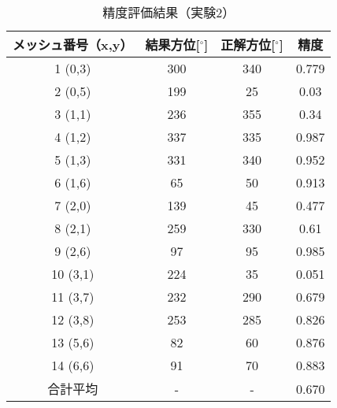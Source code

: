     \begin{table}[tbp]
      \centering
      \caption{精度評価結果（実験2）}
      \begin{tabular}{cccc}
        \hline
        \textbf{メッシュ番号（x,y）} & \textbf{結果方位[$^{\circ}$]} & \textbf{正解方位[$^{\circ}$]} & \textbf{精度} \\
        \hline  \hline
        1 (0,3) & 300 & 340 & 0.779 \\
        2 (0,5) & 199 & 25 & 0.03 \\
        3 (1,1) & 236 & 355 & 0.34 \\
        4 (1,2) & 337 & 335 & 0.987 \\
        5 (1,3) & 331 & 340 & 0.952 \\
        6 (1,6) & 65 & 50 & 0.913 \\
        7 (2,0) & 139 & 45 & 0.477 \\
        8 (2,1) & 259 & 330 & 0.61 \\
        9 (2,6) & 97 & 95 & 0.985 \\
        10 (3,1) & 224 & 35 & 0.051 \\
        11 (3,7) & 232 & 290 & 0.679 \\
        12 (3,8) & 253 & 285 & 0.826 \\
        13 (5,6) & 82 & 60 & 0.876 \\
        14 (6,6) & 91 & 70 & 0.883 \\
        合計平均 & - & - & 0.670 \\
        \hline
      \end{tabular}
    \end{table}


